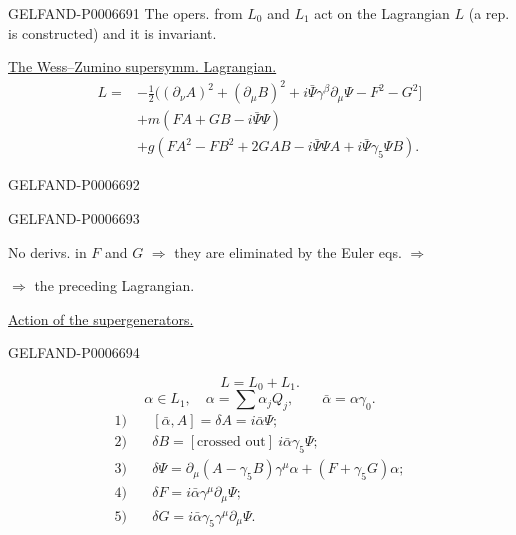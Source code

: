 \begin{GelfandAdjacentEvidence}{GELFAND-P000669}{1}
The opers. from \(L_0\) and \(L_1\) act on the Lagrangian \(L\) (a rep. is constructed)
and it is invariant.

\underline{The Wess–Zumino supersymm. Lagrangian.}
\[
\begin{aligned}
L={}&-\tfrac12\bigl((\partial_\nu A)^2+(\partial_\mu B)^2
+i\bar\Psi\gamma^\beta\partial_\mu\Psi-F^2-G^2\bigr]\\
&+m(FA+GB-i\bar\Psi\Psi)\\
&+g(FA^2-FB^2+2GAB-i\bar\Psi\Psi A+i\bar\Psi\gamma_5\Psi B).
\end{aligned}
\]
\end{GelfandAdjacentEvidence}
\begin{GelfandAdjacentEvidence}{GELFAND-P000669}{2}

\end{GelfandAdjacentEvidence}
\begin{GelfandAdjacentEvidence}{GELFAND-P000669}{3}


No derivs. in \(F\) and \(G\) \(\Rightarrow\) they are eliminated by the Euler eqs. \(\Rightarrow\)

\(\Rightarrow\) the preceding Lagrangian.

\underline{Action of the supergenerators.}
\end{GelfandAdjacentEvidence}
\begin{GelfandAdjacentEvidence}{GELFAND-P000669}{4}

\[
L=L_0+L_1.
\]
\[
\alpha\in L_1,\quad\alpha=\sum\alpha_jQ_j,\qquad\bar\alpha=\alpha\gamma_0.
\]
\[
\begin{aligned}
1)\quad&[\bar\alpha,A]=\delta A=i\bar\alpha\Psi;\\
2)\quad&\delta B=[\text{crossed out}]\ i\bar\alpha\gamma_5\Psi;\\
3)\quad&\delta\Psi=\partial_\mu(A-\gamma_5B)\gamma^\mu\alpha+(F+\gamma_5G)\alpha;\\
4)\quad&\delta F=i\bar\alpha\gamma^\mu\partial_\mu\Psi;\\
5)\quad&\delta G=i\bar\alpha\gamma_5\gamma^\mu\partial_\mu\Psi.
\end{aligned}
\]
\end{GelfandAdjacentEvidence}
